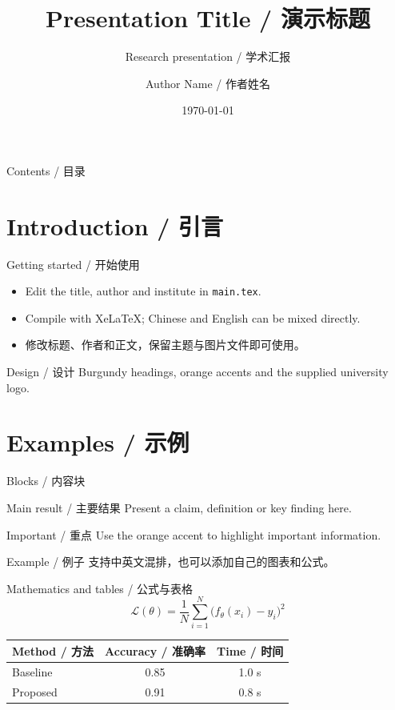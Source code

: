 \documentclass[10pt,aspectratio=169]{beamer}
\title[CityUHK (Dongguan)]{Presentation Title / 演示标题}
\subtitle{Research presentation / 学术汇报}
\author[Author Name]{Author Name / 作者姓名}
\institute{City University of Hong Kong (Dongguan)\\香港城市大学（东莞）}
\date{\today}
\begin{document}
\begin{frame}[plain]
  \titlepage
\end{frame}

\begin{frame}{Contents / 目录}
  \tableofcontents
\end{frame}

\section{Introduction / 引言}
\begin{frame}{Getting started / 开始使用}
  \begin{itemize}
    \item Edit the title, author and institute in \texttt{main.tex}.
    \item Compile with XeLaTeX; Chinese and English can be mixed directly.
    \item 修改标题、作者和正文，保留主题与图片文件即可使用。
  \end{itemize}
  \begin{block}{Design / 设计}
    Burgundy headings, orange accents and the supplied university logo.
  \end{block}
\end{frame}

\section{Examples / 示例}
\begin{frame}{Blocks / 内容块}
  \begin{block}{Main result / 主要结果}
    Present a claim, definition or key finding here.
  \end{block}
  \begin{alertblock}{Important / 重点}
    Use the orange accent to highlight important information.
  \end{alertblock}
  \begin{exampleblock}{Example / 例子}
    支持中英文混排，也可以添加自己的图表和公式。
  \end{exampleblock}
\end{frame}

\begin{frame}{Mathematics and tables / 公式与表格}
  \begin{equation*}
    \mathcal{L}(\theta)=\frac{1}{N}\sum_{i=1}^{N}
      \bigl(f_\theta(x_i)-y_i\bigr)^2
  \end{equation*}
  \vspace{0.3cm}
  \centering
  \begin{tabular}{lcc}
    \hline
    Method / 方法 & Accuracy / 准确率 & Time / 时间 \\
    \hline
    Baseline & 0.85 & 1.0 s \\
    Proposed & 0.91 & 0.8 s \\
    \hline
  \end{tabular}
  \par{}
\end{frame}
\end{document}
